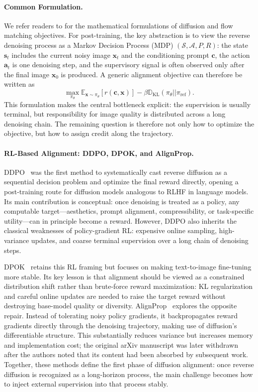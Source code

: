 \documentclass{llmxive}
\providecommand{\vx}{\mathbf{x}}
\providecommand{\vs}{\mathbf{s}}
\providecommand{\va}{\mathbf{a}}
\providecommand{\vc}{\mathbf{c}}
\begin{document}
\paragraph{Common Formulation.}
We refer readers to  for the mathematical formulations of diffusion and flow matching objectives. For post-training, the key abstraction is to view the reverse denoising process as a Markov Decision Process (MDP) $(\mathcal{S}, \mathcal{A}, P, R)$: the state $\vs_t$ includes the current noisy image $\vx_t$ and the conditioning prompt $\vc$, the action $\va_t$ is one denoising step, and the supervisory signal is often observed only after the final image $\vx_0$ is produced. A generic alignment objective can therefore be written as
\begin{equation}
    \max_{\pi_\theta} \mathbb{E}_{\vx \sim \pi_\theta} [r(\vc, \vx)] - \beta \mathbb{D}_{\text{KL}}(\pi_\theta || \pi_{\text{ref}}).
\end{equation}
This formulation makes the central bottleneck explicit: the supervision is usually terminal, but responsibility for image quality is distributed across a long denoising chain. The remaining question is therefore not only how to optimize the objective, but how to assign credit along the trajectory.

\paragraph{RL-Based Alignment: DDPO, DPOK, and AlignProp.}
DDPO~\citep{black2023training} was the first method to systematically cast reverse diffusion as a sequential decision problem and optimize the final reward directly, opening a post-training route for diffusion models analogous to RLHF in language models. Its main contribution is conceptual: once denoising is treated as a policy, any computable target---aesthetics, prompt alignment, compressibility, or task-specific utility---can in principle become a reward. However, DDPO also inherits the classical weaknesses of policy-gradient RL: expensive online sampling, high-variance updates, and coarse terminal supervision over a long chain of denoising steps.

DPOK~\citep{fan2023dpok} retains this RL framing but focuses on making text-to-image fine-tuning more stable. Its key lesson is that alignment should be viewed as a constrained distribution shift rather than brute-force reward maximization: KL regularization and careful online updates are needed to raise the target reward without destroying base-model quality or diversity. AlignProp~\citep{prabhudesai2023alignprop} explores the opposite repair. Instead of tolerating noisy policy gradients, it backpropagates reward gradients directly through the denoising trajectory, making use of diffusion's differentiable structure. This substantially reduces variance but increases memory and implementation cost; the original arXiv manuscript was later withdrawn after the authors noted that its content had been absorbed by subsequent work. Together, these methods define the first phase of diffusion alignment: once reverse diffusion is recognized as a long-horizon process, the main challenge becomes how to inject external supervision into that process stably.
\end{document}
